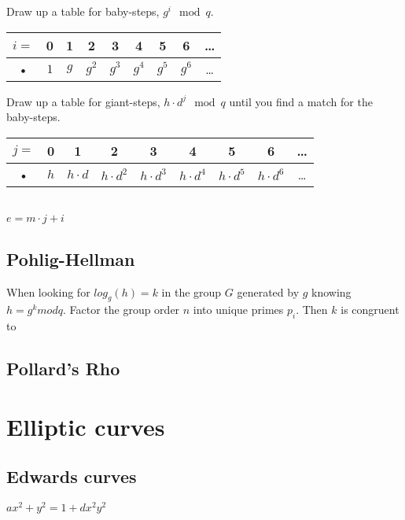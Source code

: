 \documentclass{article}
\begin{document}
Draw up a table for baby-steps, $g^i \mod q$.\\
\begin{tabular}{|c|c|c|c|c|c|c|c|c|}
\hline
$i = $ & 0 & 1 & 2 & 3 & 4 & 5 & 6 & \ldots \\
\hline
• & $1$ & $g$ & $g^2$ & $g^3$ & $g^4$ & $g^5$ & $g^6$ & \ldots \\
\hline
\end{tabular}

Draw up a table for giant-steps, $h \cdot d^j \mod q$ until you find a match for the baby-steps.\\
\begin{tabular}{|c|c|c|c|c|c|c|c|c|}
\hline
$j = $ & 0 & 1 & 2 & 3 & 4 & 5 & 6 & \ldots \\
\hline
• & $h$ & $h \cdot d$ & $h \cdot d^2$ & $h \cdot d^3$ & $h \cdot d^4$ & $h \cdot d^5$ & $h \cdot d^6$ & \ldots \\
\hline
\end{tabular} \\
$e = m \cdot j + i$

\subsection{Pohlig-Hellman}
When looking for $log_g(h) = k$ in the group $G$ generated by $g$ knowing $h = g^k mod q$.
Factor the group order $n$ into unique primes $p_i$.
Then $k$ is congruent to 


\subsection{Pollard's Rho}


\section{Elliptic curves}
\subsection{Edwards curves}
$ax^2+y^2 = 1 + dx^2y^2$
\end{document}
